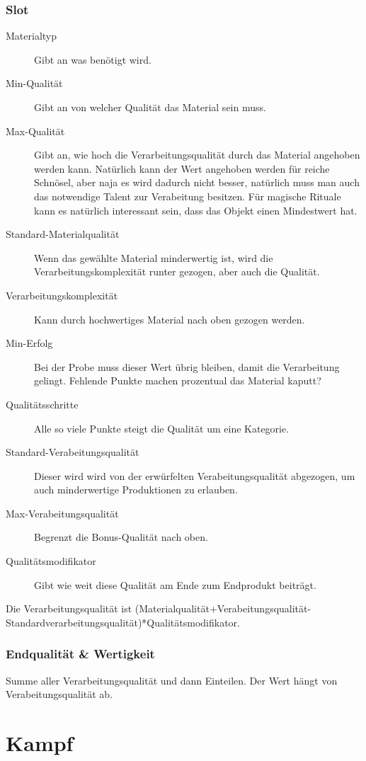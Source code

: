\documentclass[a4paper,12pt,oneside]{book}
\begin{document}
\section{Slot}
\begin{description}
\item[Materialtyp]Gibt an was benötigt wird.
\item[Min-Qualität]Gibt an von welcher Qualität das Material sein muss.
\item[Max-Qualität]Gibt an, wie hoch die Verarbeitungsqualität durch das Material angehoben werden kann. Natürlich kann der Wert angehoben werden für reiche Schnösel, aber naja es wird dadurch nicht besser, natürlich muss man auch das notwendige Talent zur Verabeitung besitzen. Für magische Rituale kann es natürlich interessant sein, dass das Objekt einen Mindestwert hat.
\item[Standard-Materialqualität]Wenn das gewählte Material minderwertig ist, wird die Verarbeitungskomplexität runter gezogen, aber auch die Qualität.
\item[Verarbeitungskomplexität]Kann durch hochwertiges Material nach oben gezogen werden.
\item[Min-Erfolg]Bei der Probe muss dieser Wert übrig bleiben, damit die Verarbeitung gelingt. Fehlende Punkte machen prozentual das Material kaputt?
\item[Qualitätsschritte]Alle so viele Punkte steigt die Qualität um eine Kategorie.
\item[Standard-Verabeitungsqualität]Dieser wird wird von der erwürfelten Verabeitungsqualität abgezogen, um auch minderwertige Produktionen zu erlauben.
\item[Max-Verabeitungsqualität]Begrenzt die Bonus-Qualität nach oben.
\item[Qualitätsmodifikator]Gibt wie weit diese Qualität am Ende zum Endprodukt beiträgt.
\end{description}
Die Verarbeitungsqualität ist (Materialqualität+Verabeitungsqualität-Standardverarbeitungsqualität)*Qualitätsmodifikator.
\section{Endqualität \& Wertigkeit}
Summe aller Verarbeitungsqualität und dann Einteilen. Der Wert hängt von Verabeitungsqualität ab.


\part{Kampf}
\setcounter{chapter}{0}
\end{document}
